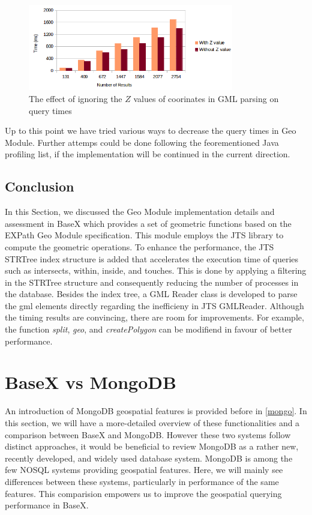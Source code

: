 \documentclass[a4paper,12pt]{article}
\begin{document}
\begin{figure}
\centering
\includegraphics[width=0.8\textwidth,height=0.2\textheight]{BXZvalue}
\caption{The effect of ignoring the $Z$ values of coorinates in GML parsing on query times}
\label{figBXZvalue}
\end{figure}

Up to this point we have tried various ways to decrease the query times in Geo Module. Further attemps could be done following the feorementioned Java profiling list, if the implementation will be continued in the current direction.

\subsection{Conclusion}
\label{BXconc}
In this Section, we discussed the Geo Module implementation details and assessment in BaseX which provides a set of geometric functions based on the EXPath Geo Module specification. This module employs the JTS library to compute the geometric operations. To enhance the performance, the JTS STRTree index structure is added that accelerates the execution time of queries such as intersects, within, inside, and touches. This is done by applying a filtering in the STRTree structure and consequently reducing the number of processes in the database. Besides the index tree, a GML Reader class is developed to parse the gml elements directly regarding the inefficieny in JTS GMLReader. Although the timing results are convincing, there are room for improvements. For example, the function \textit{split}, \textit{geo}, and \textit{createPolygon} can be modifiend in favour of better performance.

\newpage
\section{BaseX vs MongoDB}
\label{s.mongo}

An introduction of MongoDB geospatial features is provided before in \ref{mongo}. In this section, we will have a more-detailed overview of these functionalities and a comparison between BaseX and MongoDB. However these two systems follow distinct approaches, it would be beneficial to review MongoDB as a rather new, recently developed, and widely used database system. MongoDB is among the few NOSQL systems providing geospatial features. Here, we will mainly see differences between these systems, particularly in performance of the same features. This comparision empowers us to improve the geospatial querying performance in BaseX. 
\end{document}
